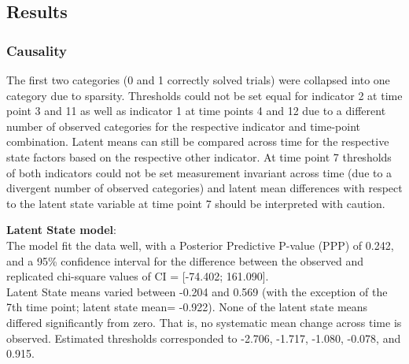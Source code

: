 \subsection{Results}

\subsubsection{Causality}

The first two categories (0 and 1 correctly solved trials) were collapsed into one category due to sparsity. Thresholds could not be set equal for indicator 2 at time point 3 and 11 as well as indicator 1 at time points 4 and 12 due to a different number of observed categories for the respective indicator and time-point combination. Latent means can still be compared across time for the respective state factors based on the respective other indicator. At time point 7 thresholds of both indicators could not be set measurement invariant across time (due to a divergent number of observed categories) and latent mean differences with respect to the latent state variable at time point 7 should be interpreted with caution.

\textbf{Latent State model}: \\
The model fit the data well, with a Posterior Predictive P-value (PPP) of 0.242, and a 95\% confidence interval for the difference between the observed and replicated chi-square values of CI = [-74.402; 161.090]. \\ Latent State means varied between -0.204 and 0.569 (with the exception of the 7th time point; latent state mean= -0.922). None of the latent state means differed significantly from zero. That is, no systematic mean change across time is observed.
Estimated thresholds corresponded to -2.706, -1.717, -1.080, -0.078, and  0.915. \\


